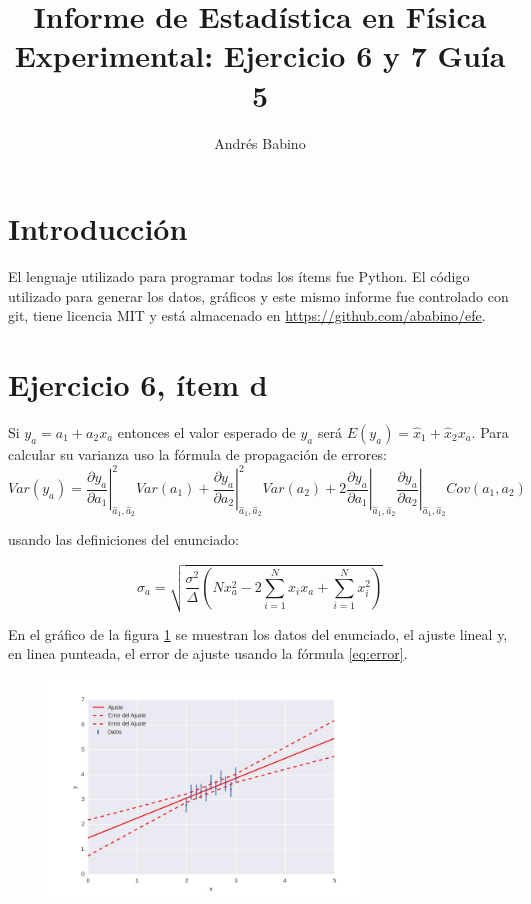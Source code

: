 \documentclass{article}
\title{Informe de Estadística en Física Experimental: Ejercicio 6 y 7 Guía 5}
\author{Andr\'es Babino}
\begin{document}
\maketitle
\section{Introducción}
El lenguaje utilizado para programar todas los ítems fue Python.
El código utilizado para generar los datos, gráficos y este mismo informe fue controlado con git, tiene licencia MIT y está almacenado en \url{https://github.com/ababino/efe}.

\section*{Ejercicio 6, ítem d}
Si $y_a=a_1 + a_2 x_a$ entonces el valor esperado de $y_a$ será $E(y_a)=\hat x_1 + \hat x_2 x_a$.
Para calcular su varianza uso la fórmula de propagación de errores:
\begin{equation}
Var(y_a) = \left. \frac{\partial y_a}{\partial a_1}\right|_{\hat a_1, \hat a_2}^2 Var(a_1) + \left. \frac{\partial y_a}{\partial a_2}\right|_{\hat a_1, \hat a_2}^2 Var(a_2) + 2 \left. \frac{\partial y_a}{\partial a_1}\right|_{\hat a_1, \hat a_2} \left. \frac{\partial y_a}{\partial a_2}\right|_{\hat a_1, \hat a_2} Cov(a_1, a_2)
\label{eq:prop}
\end{equation}

usando las definiciones del enunciado:

\begin{equation}
\sigma_a = \sqrt{\frac{\sigma^2}{\Delta} \left(N x_a^2 -2 \sum_{i=1}^N x_i x_a +\sum_{i=1}^N x_i^2\right)}
\label{eq:error}
\end{equation}

En el gráfico de la figura \ref{fig:e6d} se muestran los datos del enunciado, el ajuste lineal y, en linea punteada, el error de ajuste usando la fórmula \ref{eq:error}.

\begin{figure}
\centering
\includegraphics[width=0.75\textwidth]{ej6d.jpg}
\caption[]{}
\label{fig:e6d}
\end{figure}
\end{document}
